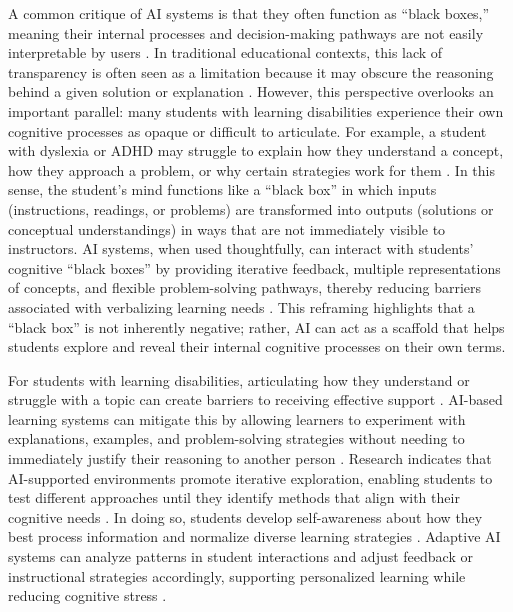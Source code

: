 \documentclass[]{aastex701}
\begin{document}
A common critique of AI systems is that they often function as ``black boxes,'' meaning their internal processes and decision-making pathways are not easily interpretable by users \autocite{Skogvoll2025, BenZion2025}. In traditional educational contexts, this lack of transparency is often seen as a limitation because it may obscure the reasoning behind a given solution or explanation \autocite{Skogvoll2025}. However, this perspective overlooks an important parallel: many students with learning disabilities experience their own cognitive processes as opaque or difficult to articulate. For example, a student with dyslexia or ADHD may struggle to explain how they understand a concept, how they approach a problem, or why certain strategies work for them \autocite{Almufareh2025, HarkinsBrown2025}. In this sense, the student's mind functions like a ``black box'' in which inputs (instructions, readings, or problems) are transformed into outputs (solutions or conceptual understandings) in ways that are not immediately visible to instructors. AI systems, when used thoughtfully, can interact with students' cognitive ``black boxes'' by providing iterative feedback, multiple representations of concepts, and flexible problem-solving pathways, thereby reducing barriers associated with verbalizing learning needs \autocite{Voultsiou2025, Khowaja2025}. This reframing highlights that a ``black box'' is not inherently negative; rather, AI can act as a scaffold that helps students explore and reveal their internal cognitive processes on their own terms.

For students with learning disabilities, articulating how they understand or struggle with a topic can create barriers to receiving effective support \autocite{Almufareh2025, HarkinsBrown2025}. AI-based learning systems can mitigate this by allowing learners to experiment with explanations, examples, and problem-solving strategies without needing to immediately justify their reasoning to another person \autocite{Khowaja2025, Weijers2025}. Research indicates that AI-supported environments promote iterative exploration, enabling students to test different approaches until they identify methods that align with their cognitive needs \autocite{Voultsiou2025, Khowaja2025}. In doing so, students develop self-awareness about how they best process information and normalize diverse learning strategies \autocite{Voultsiou2025, Weijers2025}. Adaptive AI systems can analyze patterns in student interactions and adjust feedback or instructional strategies accordingly, supporting personalized learning while reducing cognitive stress \autocite{Khowaja2025, Skogvoll2025}.
\end{document}
